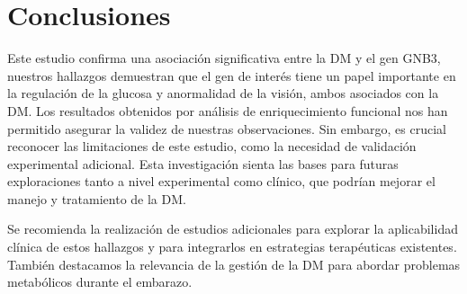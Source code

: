 \section{Conclusiones}

Este estudio confirma una asociación significativa entre la DM y el gen GNB3, nuestros hallazgos demuestran que el gen de interés tiene un papel importante en la regulación de la glucosa y anormalidad de la visión, ambos asociados con la DM. Los resultados obtenidos por análisis de enriquecimiento funcional nos han permitido asegurar la validez de nuestras observaciones. Sin embargo, es crucial reconocer las limitaciones de este estudio, como la necesidad de validación experimental adicional.
Esta investigación sienta las bases para futuras exploraciones tanto a nivel experimental como clínico, que podrían mejorar el manejo y tratamiento de la DM.

Se recomienda la realización de estudios adicionales para explorar la aplicabilidad clínica de estos hallazgos y para integrarlos en estrategias terapéuticas existentes. También destacamos la relevancia de la gestión de la DM para abordar problemas metabólicos durante el embarazo. 

